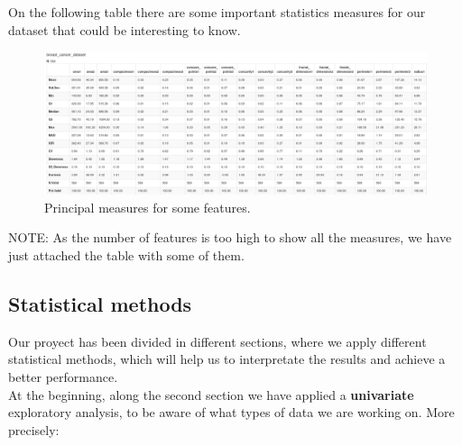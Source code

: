 \documentclass[10pt,a4paper]{article}
\theoremstyle{definition}
\theoremstyle{definition}
\begin{document}
On the following table there are some important statistics measures for our dataset that could be interesting to know. 

\begin{figure}[h]
	\centering
	\includegraphics[width=1\textwidth]{statistics_measures}
	\caption{Principal measures for some features.}
	\label{fig:etiqueta}
\end{figure}

NOTE: As the number of features is too high to show all the measures, we have just attached the table with some of them.

\subsection{Statistical methods}

Our proyect has been divided in different sections, where we apply different statistical methods, which will help us to interpretate the results and achieve a better performance. \\


At the beginning, along the second section  we have applied a \textbf{univariate} exploratory analysis, to be aware of what types of data we are working on. More precisely:
\end{document}
